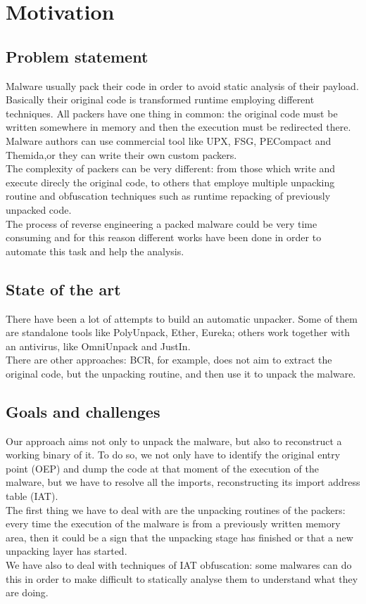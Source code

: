 \chapter{Motivation}
\label{chapter2}
\thispagestyle{empty}

\section{Problem statement}
Malware usually pack their code in order to avoid static analysis of their payload. Basically their original code is transformed runtime employing different techniques. All packers have one thing in common: the original code must be written somewhere in memory and then the execution must be redirected there. Malware authors can use commercial tool  like UPX, FSG, PECompact and Themida,or they can write their own custom packers.\\
The complexity of packers can be very different: from those which write and execute direcly the original code, to others that employe multiple unpacking routine and obfuscation techniques such as runtime repacking of previously unpacked code. \\
The process of reverse engineering a packed malware could be very time consuming and for this reason different works have been done in order to automate this  task and help the analysis.  

\section{State of the art}
There have been a lot of attempts to build an automatic unpacker. Some of them are standalone tools like PolyUnpack, Ether, Eureka; others work together with an antivirus, like OmniUnpack and JustIn.\\
There are other approaches: BCR, for example, does not aim to extract the original code, but the unpacking routine, and then use it to unpack the malware.

\section{Goals and challenges}
Our approach aims not only to unpack the malware, but also to reconstruct a working binary of it. To do so, we not only have to identify the original entry point (OEP) and dump the code at that moment of the execution of the malware, but we have to resolve all the imports, reconstructing its import address table (IAT).\\
The first thing we have to deal with are the unpacking routines of the packers: every time the execution of the malware is from a previously written memory area, then it could be a sign that the unpacking stage has finished or that a new unpacking layer has started.\\
We have also to deal with techniques of IAT obfuscation: some malwares can do this in order to make difficult to statically analyse them to understand what they are doing.

